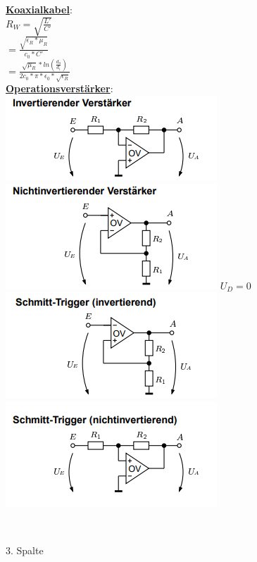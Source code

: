\documentclass[11pt]{article}
\begin{document}
\begin{landscape}
\begin{minipage}{0.3\textwidth}
\underline{\textbf{Koaxialkabel}}:\\
$R_W = \sqrt{\frac{L'}{C'}}$\\
    \phantom{sssi} $=\frac{\sqrt{\epsilon_R * \mu_R}}{c_0 * C'}$\\
    \phantom{sssi} $=\frac{\sqrt{\mu_R} * ln(\frac{d_a}{d_i})}{2c_0 * \pi * \epsilon_0 *\sqrt{\epsilon_R}}$\\
\underline{\textbf{Operationsverstärker}}:\\
\includegraphics[scale=0.40]{IOV.png}
\includegraphics[scale=0.40]{NIOV.png}
$U_D = 0$
\includegraphics[scale=0.40]{ISTOV.png}
\includegraphics[scale=0.40]{NISTOV.png}

\end{minipage}%
~~~~~~
\begin{minipage}{0.3\textwidth}
3. Spalte
\end{minipage}%

\end{landscape}
\end{document}
